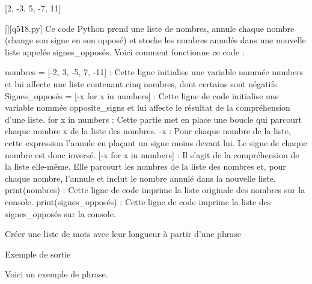 [2, -3, 5, -7, 11]
        \par
        \begin{solution}
            \renewcommand{\nomfichier}{q518.py}
            \pythonfile{\chemincode \nomfichier}[][\nomfichier]
            Ce code Python prend une liste de nombres, annule chaque nombre (change son signe en son opposé) et stocke les nombres annulés dans une nouvelle liste appelée signes\_opposés. Voici comment fonctionne ce code :

    nombres = [-2, 3, -5, 7, -11] : Cette ligne initialise une variable nommée numbers et lui affecte une liste contenant cinq nombres, dont certains sont négatifs.
    Signes\_opposés = [-x for x in numbers] : Cette ligne de code initialise une variable nommée opposite\_signs et lui affecte le résultat de la compréhension d'une liste.
        for x in numbers : Cette partie met en place une boucle qui parcourt chaque nombre x de la liste des nombres.
        -x : Pour chaque nombre de la liste, cette expression l'annule en plaçant un signe moins devant lui. Le signe de chaque nombre est donc inversé.
        [-x for x in numbers] : Il s'agit de la compréhension de la liste elle-même. Elle parcourt les nombres de la liste des nombres et, pour chaque nombre, l'annule et inclut le nombre annulé dans la nouvelle liste.
    print(nombres) : Cette ligne de code imprime la liste originale des nombres sur la console.
    print(signes\_opposés) : Cette ligne de code imprime la liste des signes\_opposés sur la console.
        \end{solution}
        

        \question
        Créer une liste de mots avec leur longueur à partir d'une phrase

Exemple de sortie

Voici un exemple de phrase.

